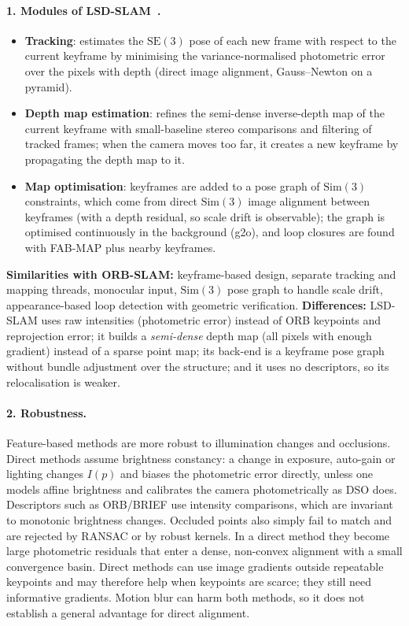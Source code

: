 \paragraph{1. Modules of LSD-SLAM~\cite{engel2014lsd}.}
\begin{itemize}
\item \textbf{Tracking}: estimates the $\mathrm{SE}(3)$ pose of each new frame with respect to
  the current keyframe by minimising the variance-normalised photometric error over the
  pixels with depth (direct image alignment, Gauss--Newton on a pyramid).
\item \textbf{Depth map estimation}: refines the semi-dense inverse-depth map of the current
  keyframe with small-baseline stereo comparisons and filtering of tracked frames; when
  the camera moves too far, it creates a new keyframe by propagating the depth map to it.
\item \textbf{Map optimisation}: keyframes are added to a pose graph of $\mathrm{Sim}(3)$
  constraints, which come from direct $\mathrm{Sim}(3)$ image alignment between keyframes
  (with a depth residual, so scale drift is observable); the graph is optimised
  continuously in the background (g2o), and loop closures are found with FAB-MAP plus
  nearby keyframes.
\end{itemize}
\textbf{Similarities with ORB-SLAM:} keyframe-based design, separate tracking and mapping
threads, monocular input, $\mathrm{Sim}(3)$ pose graph to handle scale drift, appearance-based
loop detection with geometric verification. \textbf{Differences:} LSD-SLAM uses raw intensities
(photometric error) instead of ORB keypoints and reprojection error; it builds a
\emph{semi-dense} depth map (all pixels with enough gradient) instead of a sparse point map;
its back-end is a keyframe pose graph without bundle adjustment over the structure; and it
uses no descriptors, so its relocalisation is weaker.

\paragraph{2. Robustness.}
Feature-based methods are more robust to illumination changes and occlusions. Direct methods
assume brightness constancy: a change in exposure, auto-gain or lighting changes $I(p)$ and
biases the photometric error directly, unless one models affine brightness and calibrates
the camera photometrically as DSO does. Descriptors such as ORB/BRIEF use intensity
comparisons, which are invariant to monotonic brightness changes. Occluded points also simply fail to
match and are rejected by RANSAC or by robust kernels. In a direct method they become large
photometric residuals that enter a dense, non-convex alignment with a small convergence
basin. Direct methods can use image gradients outside repeatable keypoints and may therefore
help when keypoints are scarce; they still need informative gradients. Motion blur can
harm both methods, so it does not establish a general advantage for direct alignment.

